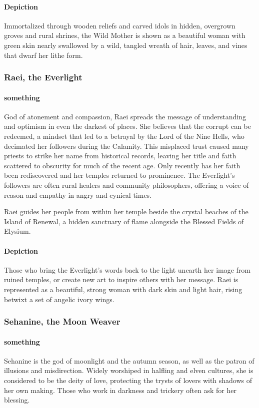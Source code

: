 \documentclass[letterpaper,twocolumn,openany,nodeprecatedcode]{dndbook}
\begin{document}
\paragraph{Depiction}
Immortalized through wooden reliefs and carved idols in hidden, overgrown groves and rural
shrines, the Wild Mother is shown as a beautiful woman with green skin nearly swallowed by
a wild, tangled wreath of hair, leaves, and vines that dwarf her lithe form.

\subsubsection{Raei, the Everlight}

\paragraph{something}
God of atonement and compassion, Raei spreads the message of understanding and optimism in
even the darkest of places. She believes that the corrupt can be redeemed, a mindset that led
to a betrayal by the Lord of the Nine Hells, who decimated her followers during the Calamity.
This misplaced trust caused many priests to strike her name from historical records, leaving
her title and faith scattered to obscurity for much of the recent age. Only recently has her
faith been rediscovered and her temples returned to prominence. The Everlight’s followers are
often rural healers and community philosophers, offering a voice of reason and empathy in
angry and cynical times.

Raei guides her people from within her temple beside the crystal beaches of the Island of
Renewal, a hidden sanctuary of flame alongside the Blessed Fields of Elysium.

\paragraph{Depiction}
Those who bring the Everlight’s words back to the light unearth her image from ruined temples,
or create new art to inspire others with her message. Raei is represented as a beautiful,
strong woman with dark skin and light hair, rising betwixt a set of angelic ivory wings.

\subsubsection{Sehanine, the Moon Weaver}

\paragraph{something}
Sehanine is the god of moonlight and the autumn season, as well as the patron of illusions
and misdirection. Widely worshiped in halfling and elven cultures, she is considered to be
the deity of love, protecting the trysts of lovers with shadows of her own making. Those who
work in darkness and trickery often ask for her blessing.
\end{document}
